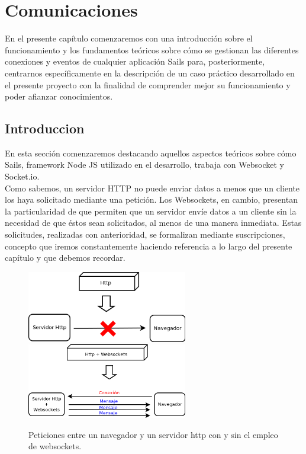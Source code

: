 

\newpage

\chapter{Comunicaciones}
\label{chap:comunicaciones}

En el presente capítulo comenzaremos con una introducción sobre el funcionamiento y los fundamentos teóricos sobre cómo se gestionan las diferentes conexiones y eventos de cualquier aplicación
Sails para, posteriormente, centrarnos específicamente en la descripción de un caso práctico desarrollado en el presente proyecto con la finalidad de comprender mejor su funcionamiento y poder afianzar
conocimientos.


\section{Introduccion}
\label{sec:fundamentos}

En esta sección comenzaremos destacando aquellos aspectos teóricos sobre cómo Sails, framework Node JS utilizado en el desarrollo, trabaja con Websocket y Socket.io.\\

Como sabemos, un servidor HTTP no puede enviar datos a menos que un cliente los haya solicitado mediante una petición. Los Websockets, en cambio, presentan la particularidad de que
permiten que un servidor envíe datos a un cliente sin la necesidad de que éstos sean solicitados, al menos de una manera inmediata. Estas solicitudes, realizadas con anterioridad, se formalizan mediante suscripciones, concepto que 
iremos constantemente haciendo referencia a lo largo del presente capítulo y que debemos recordar.\\


\begin{figure}%
    \centering
    \includegraphics[width=7cm]{diagramas/http-weboscket.png}
    \qquad
    \includegraphics[width=7cm]{diagramas/http+weboscket.png}
    \caption{Peticiones entre un navegador y un servidor http con y sin el empleo de websockets.}%
    \label{fig:http-request}%
\end{figure}

